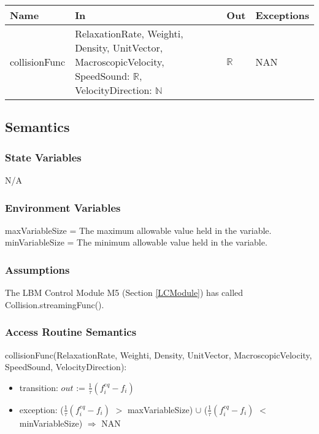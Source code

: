 \documentclass[12pt, titlepage]{article}
\begin{document}
\begin{center}
	\begin{tabular}{p{3cm} p{3cm} p{3cm} p{2cm}}
		\hline
		\textbf{Name} & \textbf{In} & \textbf{Out} & \textbf{Exceptions} \\
		\hline
		collisionFunc & RelaxationRate, Weighti, Density, UnitVector, MacroscopicVelocity, SpeedSound: $\mathbb{R}$, VelocityDirection: $\mathbb{N}$ & $\mathbb{R}$ & NAN \\
		\hline
	\end{tabular}
\end{center}

\subsection{Semantics}

\subsubsection{State Variables}
N/A

\subsubsection{Environment Variables}
maxVariableSize = The maximum allowable value held in the variable.\\
minVariableSize = The minimum allowable value held in the variable.

\subsubsection{Assumptions}

The LBM Control Module M5 (Section \ref{LCModule}) has called Collision.streamingFunc().

\subsubsection{Access Routine Semantics}

\noindent collisionFunc(RelaxationRate, Weighti, Density, UnitVector, MacroscopicVelocity, SpeedSound, VelocityDirection):
\begin{itemize}
	\item transition: $out$ := $\frac{1}{\tau}(f_{i}^{eq}-f_{i})$
	\item exception: ($\frac{1}{\tau}(f_{i}^{eq}-f_{i})$ $>$ maxVariableSize) $\cup$ ($\frac{1}{\tau}(f_{i}^{eq}-f_{i})$ $<$ minVariableSize) $\Rightarrow$ NAN
\end{itemize}
\end{document}
